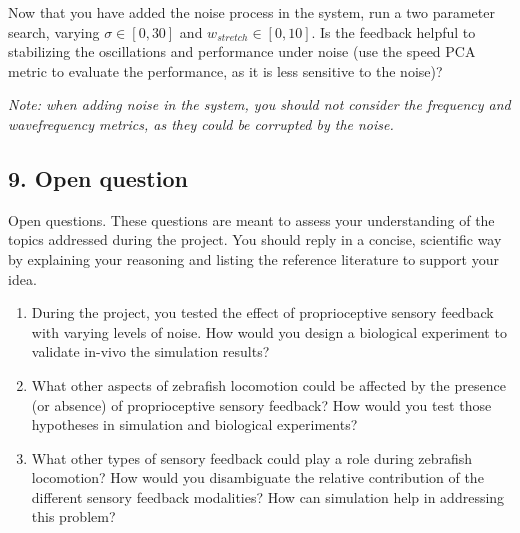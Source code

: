 \documentclass{cmc}
\begin{document}
Now that you have added the noise process in the system, run a two parameter search, varying $\sigma \in \left[0, 30\right]$ and $w_{stretch} \in \left[0, 10\right]$. Is the feedback helpful to stabilizing the oscillations and performance under noise (use the speed PCA metric to evaluate the performance, as it is less sensitive to the noise)?

\textit{Note: when adding noise in the system, you should not consider the frequency and wavefrequency metrics, as they could be corrupted by the noise.}




\subsection*{9. Open question}\label{sec:ex9}
Open questions. These questions are meant to assess your understanding of the topics addressed during the project. You should reply in a concise, scientific way by explaining your reasoning and listing the reference literature to support your idea.

\begin{enumerate}
\item During the project, you tested the effect of proprioceptive sensory feedback with varying levels of noise. How would you design a biological experiment to validate in-vivo the simulation results?
\item What other aspects of zebrafish locomotion could be affected by the presence (or absence) of proprioceptive sensory feedback? How would you test those hypotheses in simulation and biological experiments?
\item What other types of sensory feedback could play a role during zebrafish locomotion? How would you disambiguate the relative contribution of the different sensory feedback modalities? How can simulation help in addressing this problem?
\end{enumerate}







\label{sec:references}






\end{document}

